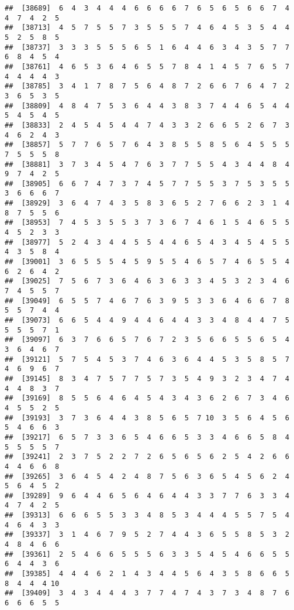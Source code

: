 \documentclass[
]{book}
\begin{document}
\begin{verbatim}
##  [38689]  6  4  3  4  4  4  6  6  6  6  7  6  5  6  5  6  6  7  4  4  7  4  2  5
##  [38713]  4  5  7  5  5  7  3  5  5  5  7  4  6  4  5  3  5  4  4  5  2  5  8  5
##  [38737]  3  3  3  5  5  5  6  5  1  6  4  4  6  3  4  3  5  7  7  6  8  4  5  4
##  [38761]  4  6  5  3  6  4  6  5  5  7  8  4  1  4  5  7  6  5  7  4  4  4  4  3
##  [38785]  3  4  1  7  8  7  5  6  4  8  7  2  6  6  7  6  4  7  2  3  6  5  3  5
##  [38809]  4  8  4  7  5  3  6  4  4  3  8  3  7  4  4  6  5  4  4  5  4  5  4  5
##  [38833]  2  4  5  4  5  4  4  7  4  3  3  2  6  6  5  2  6  7  3  4  6  2  4  3
##  [38857]  5  7  7  6  5  7  6  4  3  8  5  5  8  5  6  4  5  5  5  7  5  5  5  8
##  [38881]  3  7  3  4  5  4  7  6  3  7  7  5  5  4  3  4  4  8  4  9  7  4  2  5
##  [38905]  6  6  7  4  7  3  7  4  5  7  7  5  5  3  7  5  3  5  5  3  6  6  6  7
##  [38929]  3  6  4  7  4  3  5  8  3  6  5  2  7  6  6  2  3  1  4  8  7  5  5  6
##  [38953]  7  4  5  3  5  5  3  7  3  6  7  4  6  1  5  4  6  5  5  4  5  2  3  3
##  [38977]  5  2  4  3  4  4  5  5  4  4  6  5  4  3  4  5  4  5  5  4  3  5  8  4
##  [39001]  3  6  5  5  5  4  5  9  5  5  4  6  5  7  4  6  5  5  4  6  2  6  4  2
##  [39025]  7  5  6  7  3  6  4  6  3  6  3  3  4  5  3  2  3  4  6  7  4  5  5  7
##  [39049]  6  5  5  7  4  6  7  6  3  9  5  3  3  6  4  6  6  7  8  5  5  7  4  4
##  [39073]  6  6  5  4  4  9  4  4  6  4  4  3  3  4  8  4  4  7  5  5  5  5  7  1
##  [39097]  6  3  7  6  6  5  7  6  7  2  3  5  6  6  5  5  6  5  4  3  6  4  6  7
##  [39121]  5  7  5  4  5  3  7  4  6  3  6  4  4  5  3  5  8  5  7  4  6  9  6  7
##  [39145]  8  3  4  7  5  7  7  5  7  3  5  4  9  3  2  3  4  7  4  4  4  8  3  7
##  [39169]  8  5  5  6  4  6  4  5  4  3  4  3  6  2  6  7  3  4  6  4  5  5  2  5
##  [39193]  3  7  3  6  4  4  3  8  5  6  5  7 10  3  5  6  4  5  6  5  4  6  6  3
##  [39217]  6  5  7  3  3  6  5  4  6  6  5  3  3  4  6  6  5  8  4  5  5  5  5  7
##  [39241]  2  3  7  5  2  2  7  2  6  5  6  5  6  2  5  4  2  6  6  4  4  6  6  8
##  [39265]  3  6  4  5  4  2  4  8  7  5  6  3  6  5  4  5  6  2  4  5  6  4  5  2
##  [39289]  9  6  4  4  6  5  6  4  6  4  4  3  3  7  7  6  3  3  4  4  7  4  2  5
##  [39313]  6  6  6  5  5  3  3  4  8  5  3  4  4  4  5  5  7  5  4  4  6  4  3  3
##  [39337]  3  1  4  6  7  9  5  2  7  4  4  3  6  5  5  8  5  3  2  4  8  4  6  6
##  [39361]  2  5  4  6  6  5  5  5  6  3  3  5  4  5  4  6  6  5  5  6  4  4  3  6
##  [39385]  4  4  4  6  2  1  4  3  4  4  5  6  4  3  5  8  6  6  5  8  4  4  4 10
##  [39409]  3  4  3  4  4  4  3  7  7  4  7  4  3  7  3  4  8  7  6  6  6  6  5  5

\end{verbatim}
\end{document}
